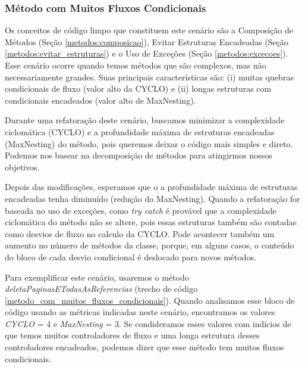 	
\subsubsection{Método com Muitos Fluxos Condicionais}
                  
Os conceitos de código limpo que constituem este cenário são a Composição de Métodos (Seção \ref{metodos:composicao}), Evitar Estruturas Encadeadas (Seção \ref{metodos:evitar_estruturas}) e o Uso de Exceções (Seção \ref{metodos:excecoes}). Esse cenário ocorre quando temos métodos que são complexos, mas não necessariamente grandes. Suas principais características são: (i) muitas quebras condicionais de fluxo (valor alto da CYCLO) e (ii) longas estruturas com condicionais encadeados (valor alto de MaxNesting).
                                                                                 
Durante uma refatoração deste cenário, buscamos minimizar a complexidade ciclomática (CYCLO) e a profundidade máxima de estruturas encadeadas (MaxNesting) do método, pois queremos deixar o código mais simples e direto. Podemos nos basear na decomposição de métodos para atingirmos nossos objetivos.
	
Depois das modificações, esperamos que o a profundidade máxima de estruturas encadeadas tenha diminuído (redução do MaxNesting). Quando a refatoração for baseada no uso de exceções, como \textit{try catch} é provável que a complexidade ciclomática do método não se altere, pois essas estruturas também são contadas como desvios de fluxo no calculo da CYCLO. Pode acontecer também um aumento no número de métodos da classe, porque, em alguns casos, o conteúdo do bloco de cada desvio condicional é deslocado para novos métodos. 
           
Para exemplificar este cenário, usaremos o método \textit{deletaPaginasETodasAsReferencias} (trecho de código \ref{metodo_com_muitos_fluxos_condicionais}). Quando analisamos esse bloco de código usando as métricas indicadas neste cenário, encontramos os valores \textit{CYCLO} = 4 e \textit{MaxNesting} = 3. Se condideramos esses valores com indícios de que temos muitos controladores de fluxo e uma longa estrutura desses controladores encadeados, podemos dizer que esse método tem muitos fluxos condicionais. 
                                                                                          
               
                                                                                          
